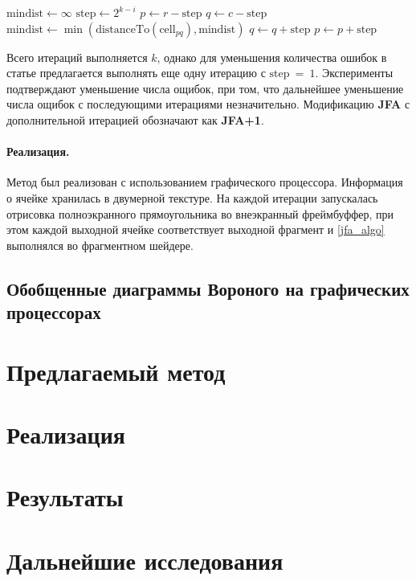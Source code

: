 \documentclass[12pt]{article}
\begin{document}
\begin{algorithmic}
\label{jfa_algo}
\State $\mathrm{mindist} \leftarrow \infty$
\State $\mathrm{step} \gets 2^{k - i}$
\State $p \gets r - \mathrm{step}$
	\State $q \gets c - \mathrm{step}$
			\State $\mathrm{mindist} \gets 
 					\min(\mathrm{distanceTo}(\mathrm{cell}_{pq}), \mathrm{mindist})$
		\EndIf
		\State $q \gets q + \mathrm{step}$
 	\EndWhile
\State $p \gets p + \mathrm{step}$
\EndWhile
\end{algorithmic}

Всего итераций выполняется $k$, однако для уменьшения количества ошибок в
статье предлагается выполнять еще одну итерацию с $\mathrm{step}~=~1$.
Эксперименты подтверждают уменьшение числа ощибок, при том, что дальнейшее
уменьшение числа ощибок с последующими итерациями незначительно. Модификацию
\textbf{JFA} с дополнительной итерацией обозначают как \textbf{JFA+1}.

\paragraph{Реализация.} Метод был реализован с использованием графического
процессора. Информация о ячейке хранилась в двумерной текстуре. На каждой
итерации запускалась отрисовка полноэкранного прямоугольника во внеэкранный
фреймбуффер, при этом каждой выходной ячейке соответствует выходной фрагмент
и \ref{jfa_algo} выполнялся во фрагментном шейдере.

\subsection{Обобщенные диаграммы Вороного на графических процессорах}


\section{Предлагаемый метод}
\section{Реализация}
\section{Результаты}
\section{Дальнейшие исследования}
\end{document}
